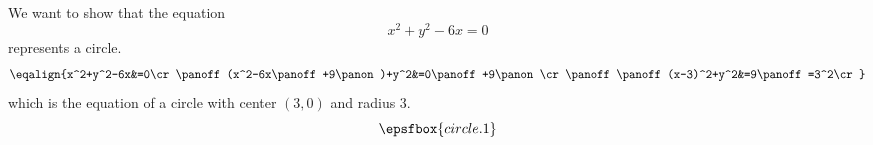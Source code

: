 

\replacementtrue
We want to show that the equation $$x^2+y^2-6x=0$$ represents a circle.
\panoff $$\eqalign{%
x^2+y^2-6x&=0\cr\panoff
(x^2-6x\panoff+9\panon)+y^2&=0\panoff+9\panon\cr
\panoff\panoff(x-3)^2+y^2&=9\panoff=3^2\cr}$$
\panoff
which is the equation of a circle with center \panoff$(3,0)$\panon{} and radius
\panoff\panoff$3$\panon\panon.
\vfill\eject
$$\epsfbox{circle.1}$$
\panoff\panoff
\panoff\panoff\panoff\panoff
\bye
